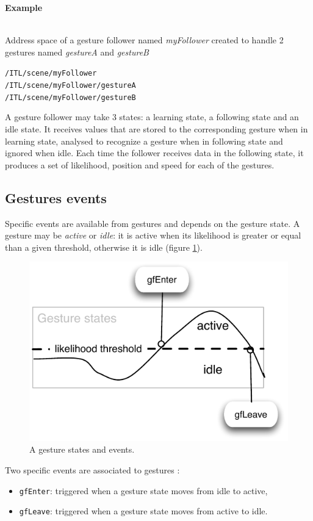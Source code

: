 \documentclass{article}
\newcommand{\code}[1]		{\texttt{\small #1}}
\newcounter{excount}
\newcommand{\exemple}			{\vspace{1mm} \hspace*{-4.5mm}\textbf{Example \arabic{excount}} \addtocounter{excount}{1}}
\newcommand{\sample}	[1]		{\begin{center}\colorbox{mygrey}{
								\begin{minipage}[t]{0.95\columnwidth} 
								{\small \texttt{#1}}
								\end{minipage}}\end{center}}
\begin{document}
\exemple \\
Address space of a gesture follower named \emph{myFollower} created to handle 2 gestures named \emph{gestureA} and \emph{gestureB}
\sample{/ITL/scene/myFollower \\
/ITL/scene/myFollower/gestureA \\
/ITL/scene/myFollower/gestureB
}

A gesture follower may take 3 states: a learning state, a following state and an idle state. It receives values that are stored to the corresponding gesture when in learning state, analysed to recognize a gesture when in following state and ignored when idle. Each time the follower receives data in the following state, it produces a set of likelihood, position and speed for each of the gestures.

\subsection{Gestures events}\label{sec:gev}
Specific events are available from gestures and depends on the gesture state. A gesture may be \emph{active} or \emph{idle}: it is active when its likelihood is greater or equal than a given threshold, otherwise it is idle (figure \ref{fig:geststates}). 

\begin{figure}[htbp]
\centerline{
	\includegraphics[width=0.6\columnwidth]{imgs/geststates}}
\caption{A gesture states and events.}
\label{fig:geststates}
\end{figure}

Two specific events are associated to gestures :
\begin{itemize}
\item \code{gfEnter}: triggered when a gesture state moves from idle to active,
\item \code{gfLeave}: triggered when a gesture state moves from active to idle.
\end{itemize}
\end{document}
